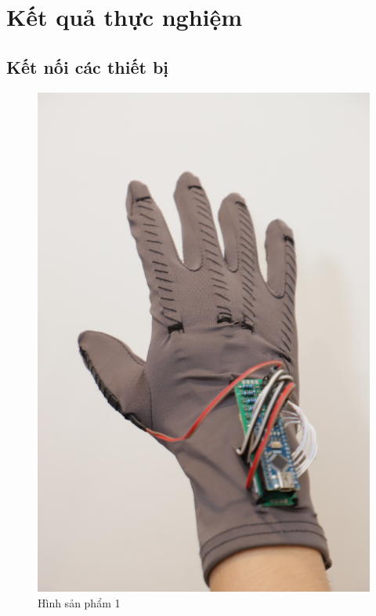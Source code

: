 \section{Kết quả thực nghiệm}

\subsection{Kết nối các thiết bị}

\begin{figure}[H]
    \centering
    \includegraphics[width=13cm]{Images/Experimental results/overview.JPG}
\caption{Hình sản phẩm 1}
\end{figure}

